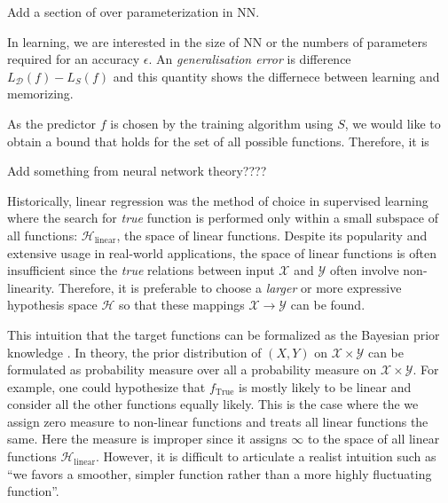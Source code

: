 Add a section of over parameterization in NN.

In learning, we are interested in the size of NN or the numbers of parameters
required for an accuracy $\epsilon$. An \textit{generalisation error} is
difference $L_\mathcal{D}(f) - L_{S}(f)$ and this quantity shows the differnece between learning and memorizing.

As the predictor $f$ is chosen by the training algorithm using $S$, we would
like to obtain a bound that holds for the set of all possible functions.
Therefore, it is 

Add something from neural network theory????

Historically, linear regression \TOCITE was the method of choice in supervised
learning where the search for \textit{true} function is performed only within a
small subspace of all functions: $\mathcal{H}_{\text{linear}}$, the space of
linear functions. Despite its popularity and extensive usage in real-world
applications, the space of linear functions is often insufficient since the
\textit{true} relations between input $\mathcal{X}$ and $\mathcal{Y}$ often
involve non-linearity. Therefore, it is preferable to choose a \textit{larger}
or more expressive hypothesis space $\mathcal{H}$ so that these mappings
$\mathcal{X} \to \mathcal{Y}$ can be found.

This intuition that the target functions can be formalized as the Bayesian prior
knowledge \TOCITE. In theory, the prior distribution of $(X, Y)$ on $\mathcal{X}
\times \mathcal{Y}$ can be formulated as probability measure over all a
probability measure on $\mathcal{X} \times \mathcal{Y}$.  For example, one could
hypothesize that $f_{\text{True}}$ is mostly likely to be linear and consider
all the other functions equally likely. This is the case where the we assign
zero measure to non-linear functions and treats all linear functions the same.
Here the measure is improper since it assigns $\infty$ to the space of all
linear functions $\mathcal{H}_{\text{linear}}$. However, it is difficult to
articulate a realist intuition such as ``we favors a smoother, simpler function
rather than a more highly fluctuating function''.

